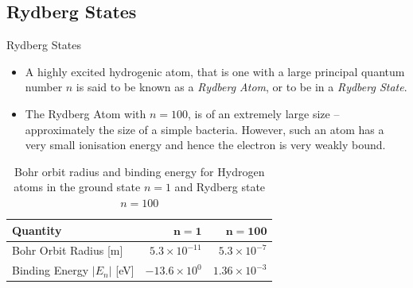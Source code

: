 \documentclass[aspectratio=1610,xcolor=dvipsnames,t]{beamer}
\begin{document}
    \subsection{Rydberg States}
    \begin{frame}{Rydberg States}  
        \begin{itemize} 
            \item A highly excited hydrogenic atom, that is one with a large principal quantum 
                  number $n$ is said to be known as a \emph{Rydberg Atom}, or to be in a
                  \emph{Rydberg State}.

            \item The Rydberg Atom with $n = 100$, is of an extremely large size -- approximately the size
    of a simple bacteria. However, such an atom has a very small ionisation energy and hence
    the electron is very weakly bound.
        \end{itemize} 
 
    \begin{table} 
        \caption{Bohr orbit radius and binding energy for Hydrogen atoms in 
                 the ground state $n=1$ and Rydberg state $n=100$} 
        \label{tbl:rydberg} 
        \centering
        \begin{tabular}{p{5cm}rr} \hline
            {\bf Quantity}               & $\mathbf{n = 1}$          & $\mathbf{n = 100}$ \\ \hline \hline 
            Bohr Orbit Radius [m]        &  $5.3 \times 10^{-11}$    & $5.3 \times 10^{-7}$ \\ 
            Binding Energy $|E_n|$ [eV]  &  $-13.6 \times 10^0$      & $1.36 \times 10^{-3}$ \\ \hline
        \end{tabular}
    \end{table} 

   \end{frame} 
\end{document}
